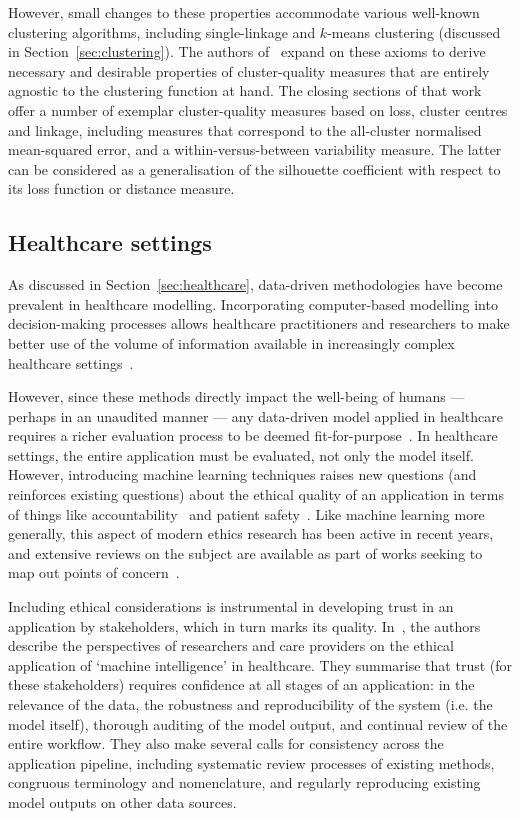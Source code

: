 However, small changes to these properties accommodate various well-known
clustering algorithms, including single-linkage and \(k\)-means clustering
(discussed in Section~\ref{sec:clustering}). The authors
of~\cite{BenDavid2008} expand on these axioms to derive necessary and desirable
properties of cluster-quality measures that are entirely agnostic to the
clustering function at hand. The closing sections of that work offer a number of
exemplar cluster-quality measures based on loss, cluster centres and linkage,
including measures that correspond to the all-cluster normalised mean-squared
error, and a within-versus-between variability measure. The latter can be
considered as a generalisation of the silhouette coefficient with respect to its
loss function or distance measure.

\subsection{Healthcare settings}

As discussed in Section~\ref{sec:healthcare}, data-driven methodologies have
become prevalent in healthcare modelling. Incorporating computer-based modelling
into decision-making processes allows healthcare practitioners and researchers
to make better use of the volume of information available in increasingly
complex healthcare
settings~\cite{Alexander2018,Belle2015,Taranu2016,Tomar2013,Tsui2015}.

However, since these methods directly impact the well-being of humans ---
perhaps in an unaudited manner --- any data-driven model applied in healthcare
requires a richer evaluation process to be deemed
fit-for-purpose~\cite{Boaz2003,Gerhards2020,Ho2020}. In healthcare settings, the
entire application must be evaluated, not only the model itself. However,
introducing machine learning techniques raises new questions (and reinforces
existing questions) about the ethical quality of an application in terms of
things like
accountability~\cite{McCradden2020accountability,Ross2017,Zawati2020} and
patient safety~\cite{Habli2020,McCradden2020safety,Sittig2015}. Like machine
learning more generally, this aspect of modern ethics research has been active
in recent years, and extensive reviews on the subject are available as part of
works seeking to map out points of
concern~\cite{Char2020,Grote2020,Obermeyer2016,Rajkomar2019}.

Including ethical considerations is instrumental in developing trust in an
application by stakeholders, which in turn marks its quality.
In~\cite{Cutillo2020}, the authors describe the perspectives of researchers and
care providers on the ethical application of `machine intelligence' in
healthcare. They summarise that trust (for these stakeholders) requires
confidence at all stages of an application: in the relevance of the data, the
robustness and reproducibility of the system (i.e. the model itself), thorough
auditing of the model output, and continual review of the entire workflow. They
also make several calls for consistency across the application pipeline,
including systematic review processes of existing methods, congruous terminology
and nomenclature, and regularly reproducing existing model outputs on other data
sources.

